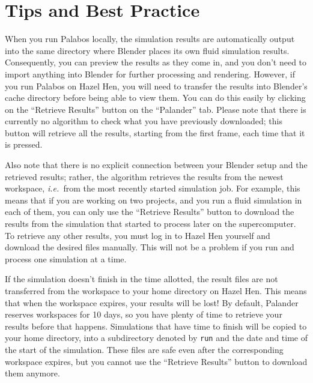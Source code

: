 \documentclass[12pt]{article}
\newcommand{\ie}{\emph{i.e.\ }}
\begin{document}
\newpage

\section{Tips and Best Practice}

When you run Palabos locally, the simulation results are automatically output into the same directory where 
Blender places its own fluid simulation results. Consequently, you can preview the results as they come in, 
and you don't need to import anything into Blender for further processing and rendering. However, if you run 
Palabos on Hazel Hen, you will need to transfer the results into Blender's cache directory before being able 
to view them. You can do this easily by clicking on the ``Retrieve Results'' button on the ``Palander'' tab. 
Please note that there is currently no algorithm to check what you have previously downloaded; this button 
will retrieve all the results, starting from the first frame, each time that it is pressed.

Also note that there is no explicit connection between your Blender setup and the retrieved results; rather, 
the algorithm retrieves the results from the newest workspace, \ie from the most recently started simulation 
job. For example, this means that if you are working on two projects, and you run a fluid simulation in each 
of them, you can only use the ``Retrieve Results'' button to download the results from the simulation that 
started to process later on the supercomputer. To retrieve any other results, you must log in to Hazel Hen 
yourself and download the desired files manually. This will not be a problem if you run and process one 
simulation at a time.

If the simulation doesn't finish in the time allotted, the result files are not transferred from the 
workspace to your home directory on Hazel Hen. This means that when the workspace expires, your results will 
be lost! By default, Palander reserves workspaces for 10 days, so you have plenty of time to retrieve your 
results before that happens. Simulations that have time to finish will be copied to your home directory, into 
a subdirectory denoted by \verb|run| and the date and time of the start of the simulation. These files are 
safe even after the corresponding workspace expires, but you cannot use the ``Retrieve Results'' button to 
download them anymore.
\end{document}
